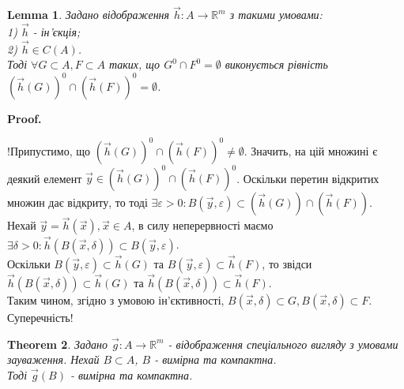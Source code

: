 \documentclass[a4paper, 10pt]{article}
\makeatletter
\def\qed{$\blacksquare$}
\theoremstyle{theoremdd}
\newtheorem{theorem}{Theorem}[subsection]
\theoremstyle{theoremdd}
\theoremstyle{theoremdd}
\theoremstyle{theoremdd}
\theoremstyle{theoremdd}
\theoremstyle{theoremdd}
\theoremstyle{theoremdd}
\newtheorem{lemma}[theorem]{Lemma}
\theoremstyle{theoremdd}
\renewenvironment{proof}[1][Proof.\\]{\par
\pushQED{\hfill \qed}%
\normalfont \topsep6\p@\@plus6\p@\relax
\trivlist
\item\relax
{\bfseries
#1\@addpunct{.}}\hspace\labelsep\ignorespaces
}{%
\popQED\endtrivlist\@endpefalse
}
\makeatother
\begin{document}
\begin{lemma}
Задано відображення $\vec{h}: A \to \mathbb{R}^m$ з такими умовами:\\
1) $\vec{h}$ - ін'єкція;\\
2) $\vec{h} \in C(A)$.\\
Тоді $\forall G \subset A, F \subset A$ таких, що $G^0 \cap F^0 = \emptyset$ виконується рівність $(\vec{h}(G))^0 \cap (\vec{h}(F))^0 = \emptyset$.
\end{lemma}

\begin{proof}
!Припустимо, що $(\vec{h}(G))^0 \cap (\vec{h}(F))^0 \neq \emptyset$. Значить, на цій множині є деякий елемент $\vec{y} \in (\vec{h}(G))^0 \cap (\vec{h}(F))^0$. Оскільки перетин відкритих множин дає відкриту, то тоді $\exists \varepsilon > 0: B(\vec{y}, \varepsilon) \subset (\vec{h}(G)) \cap (\vec{h}(F))$.\\
Нехай $\vec{y} = \vec{h}(\vec{x}), \vec{x} \in A$, в силу неперервності маємо $\exists \delta > 0: \vec{h}(B( \vec{x}, \delta )) \subset B(\vec{y},\varepsilon)$.\\
Оскільки $B(\vec{y},\varepsilon) \subset \vec{h}(G)$ та $B(\vec{y},\varepsilon) \subset \vec{h}(F)$, то звідси\\
$\vec{h}(B(\vec{x},\delta)) \subset \vec{h}(G)$ та $\vec{h}(B(\vec{x},\delta)) \subset \vec{h}(F)$.\\
Таким чином, згідно з умовою ін'єктивності, $B(\vec{x},\delta) \subset G, B(\vec{x},\delta) \subset F$. Суперечність!
\end{proof}

\begin{theorem}
Задано $\vec{g}: A \to \mathbb{R}^m$ - відображення спеціального вигляду з умовами зауваження. Нехай $B \subset A$, $B$ - вимірна та компактна.\\
Тоді $\vec{g}(B)$ - вимірна та компактна.
\end{theorem}
\end{document}
